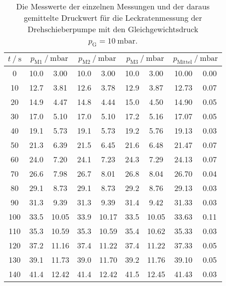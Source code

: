   \begin{table}[h]
    \centering
    \caption{Die Messwerte der einzelnen Messungen und der daraus gemittelte Druckwert für die Leckratenmessung der Drehschieberpumpe mit den 
    Gleichgewichtsdruck $p_\text{G} = \SI{10}{\milli\bar}$.}
    \label{tab:dreh_leck_10}
    \begin{tabular}{S[table-format=3.0] S @{${}\pm{}$} S[table-format=2.2] S @{${}\pm{}$} S[table-format=2.2] S @{${}\pm{}$} S[table-format=2.2] S[table-format=2.2] @{${}\pm{}$} S[table-format=1.2]}
    \toprule
    {$t \mathbin{/} \si{\second} $} &  &  &  &  \\
     & 10.0 &  3.00 & 10.0 &  3.00 & 10.0 &  3.00 & 10.00 & 0.00 \\  
     10 & 12.7 &  3.81 & 12.6 &  3.78 & 12.9 &  3.87 & 12.73 & 0.07 \\
     20 & 14.9 &  4.47 & 14.8 &  4.44 & 15.0 &  4.50 & 14.90 & 0.05 \\
     30 & 17.0 &  5.10 & 17.0 &  5.10 & 17.2 &  5.16 & 17.07 & 0.05 \\
     40 & 19.1 &  5.73 & 19.1 &  5.73 & 19.2 &  5.76 & 19.13 & 0.03 \\
     50 & 21.3 &  6.39 & 21.5 &  6.45 & 21.6 &  6.48 & 21.47 & 0.07 \\
     60 & 24.0 &  7.20 & 24.1 &  7.23 & 24.3 &  7.29 & 24.13 & 0.07 \\
     70 & 26.6 &  7.98 & 26.7 &  8.01 & 26.8 &  8.04 & 26.70 & 0.04 \\
     80 & 29.1 &  8.73 & 29.1 &  8.73 & 29.2 &  8.76 & 29.13 & 0.03 \\
     90 & 31.3 &  9.39 & 31.3 &  9.39 & 31.4 &  9.42 & 31.33 & 0.03 \\
    100 & 33.5 & 10.05 & 33.9 & 10.17 & 33.5 & 10.05 & 33.63 & 0.11 \\
    110 & 35.3 & 10.59 & 35.3 & 10.59 & 35.4 & 10.62 & 35.33 & 0.03 \\
    120 & 37.2 & 11.16 & 37.4 & 11.22 & 37.4 & 11.22 & 37.33 & 0.05 \\
    130 & 39.1 & 11.73 & 39.0 & 11.70 & 39.2 & 11.76 & 39.10 & 0.05 \\
    140 & 41.4 & 12.42 & 41.4 & 12.42 & 41.5 & 12.45 & 41.43 & 0.03 \\

\end{tabular}
\end{table}
